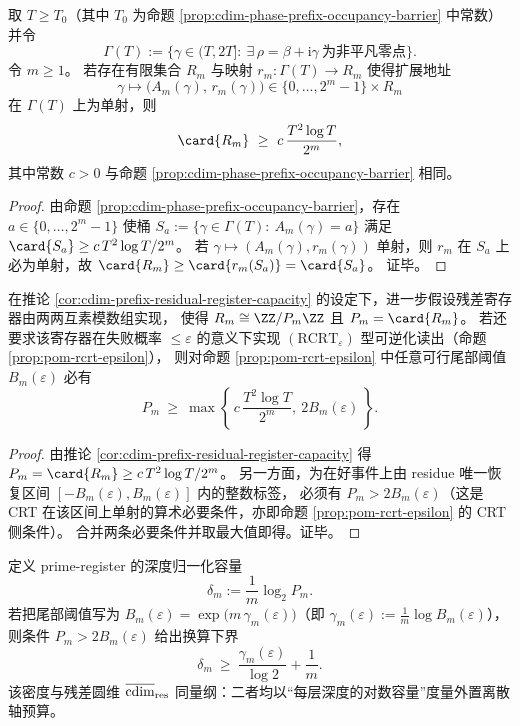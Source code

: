 \begin{corollary}[前缀地址单射化所需残差寄存器容量]\label{cor:cdim-prefix-residual-register-capacity}
取 \(T\ge T_0\)（其中 \(T_0\) 为命题 \ref{prop:cdim-phase-prefix-occupancy-barrier} 中常数）并令
\[
\Gamma(T):=\{\gamma\in(T,2T]:\ \exists\,\rho=\beta+\mathrm{i}\gamma\ \text{为非平凡零点}\}.
\]
令 \(m\ge 1\)。
若存在有限集合 \(R_m\) 与映射 \(r_m:\Gamma(T)\to R_m\) 使得扩展地址
\[
\gamma\longmapsto \bigl(A_m(\gamma),\,r_m(\gamma)\bigr)\in\{0,\dots,2^m-1\}\times R_m
\]
在 \(\Gamma(T)\) 上为单射，则
\[
\card{R_m}\ \ge\ c\,\frac{T^2\log T}{2^m},
\]
其中常数 \(c>0\) 与命题 \ref{prop:cdim-phase-prefix-occupancy-barrier} 相同。
\end{corollary}
\begin{proof}
由命题 \ref{prop:cdim-phase-prefix-occupancy-barrier}，存在 \(a\in\{0,\dots,2^m-1\}\) 使桶
\(
S_a:=\{\gamma\in\Gamma(T):\ A_m(\gamma)=a\}
\)
满足 \(\card{S_a}\ge c\,T^2\log T/2^m\)。
若 \(\gamma\mapsto(A_m(\gamma),r_m(\gamma))\) 单射，则 \(r_m\) 在 \(S_a\) 上必为单射，故
\(
\card{R_m}\ge \card{r_m(S_a)}=\card{S_a}
\)。
证毕。
\end{proof}

\begin{corollary}\label{cor:cdim-prefix-quantile-crt-joint-modulus}
在推论 \ref{cor:cdim-prefix-residual-register-capacity} 的设定下，进一步假设残差寄存器由两两互素模数组实现，
使得 \(R_m\cong \ZZ/P_m\ZZ\) 且 \(P_m=\card{R_m}\)。
若还要求该寄存器在失败概率 \(\le \varepsilon\) 的意义下实现 \((\mathrm{RCRT}_\varepsilon)\) 型可逆化读出（命题 \ref{prop:pom-rcrt-epsilon}），
则对命题 \ref{prop:pom-rcrt-epsilon} 中任意可行尾部阈值 \(B_m(\varepsilon)\) 必有
\[
P_m\ \ge\ \max\!\left\{\, c\,\frac{T^2\log T}{2^m},\ 2B_m(\varepsilon)\,\right\}.
\]
\end{corollary}
\begin{proof}
由推论 \ref{cor:cdim-prefix-residual-register-capacity} 得 \(P_m=\card{R_m}\ge c\,T^2\log T/2^m\)。
另一方面，为在好事件上由 residue 唯一恢复区间 \([-B_m(\varepsilon),B_m(\varepsilon)]\) 内的整数标签，
必须有 \(P_m>2B_m(\varepsilon)\)（这是 CRT 在该区间上单射的算术必要条件，亦即命题 \ref{prop:pom-rcrt-epsilon} 的 CRT 侧条件）。
合并两条必要条件并取最大值即得。证毕。
\end{proof}

\begin{remark}[模积的深度归一化密度]\label{rem:cdim-prime-register-density}
定义 prime-register 的深度归一化容量
\[
\delta_m:=\frac{1}{m}\log_2 P_m.
\]
若把尾部阈值写为 \(B_m(\varepsilon)=\exp\!\bigl(m\,\gamma_m(\varepsilon)\bigr)\)（即 \(\gamma_m(\varepsilon):=\frac{1}{m}\log B_m(\varepsilon)\)），
则条件 \(P_m>2B_m(\varepsilon)\) 给出换算下界
\[
\delta_m\ \ge\ \frac{\gamma_m(\varepsilon)}{\log 2}+\frac{1}{m}.
\]
该密度与残差圆维 \(\overline{\operatorname{cdim}}_{\mathrm{res}}\) 同量纲：二者均以“每层深度的对数容量”度量外置离散轴预算。
\end{remark}

